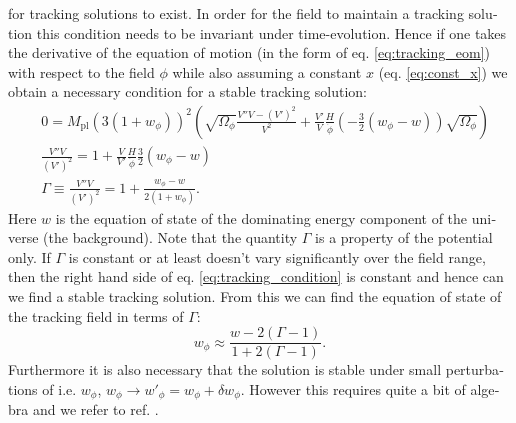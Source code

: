 \documentclass[master,       %
               twoside,        %
               BCOR10mm,       %
               english,ngerman, %
               ]{GAUBM}
\begin{document}
\begin{otherlanguage}{english}
for tracking solutions to exist.
In order for the field to maintain a tracking solution this condition needs to be invariant under time-evolution. Hence if one takes the derivative of the equation of motion (in the form of eq. \eqref{eq:tracking_eom}) with respect to the field $\phi$ while also assuming a constant $x$ (eq. \eqref{eq:const_x}) we obtain a necessary condition for a stable tracking solution:
\begin{align}
	&0 = M_\mathrm{pl}  (3(1 + w_\phi))^2 \left( \sqrt{\Omega_\phi} \frac{V'' V - (V')^2}{V^2} + \frac{V'}{V} \frac{H}{\dot{\phi}} \left( - \frac{3}{2} (w_\phi - w) \right) \sqrt{\Omega_\phi} \right) \nonumber \\
	&\frac{V'' V}{(V')^2} = 1 + \frac{V}{V'} \frac{H}{\dot{\phi}} \frac{3}{2} (w_\phi - w) \nonumber \\
	& \Gamma \equiv \frac{V'' V}{(V')^2} = 1 + \frac{w_\phi - w}{2(1 + w_\phi)}.
	\label{eq:tracking_condition}
\end{align}
Here $w$ is the equation of state of the dominating energy component of the universe (the background).
Note that the quantity $\Gamma$ is a property of the potential only.
If $\Gamma$ is constant or at least doesn't vary significantly over the field range, then the right hand side of eq. \eqref{eq:tracking_condition}  is constant and hence can we find a stable tracking solution.
From this we can find the equation of state of the tracking field in terms of $\Gamma$:
\begin{equation}
	\label{eq:tracking_equation_of_state}
	w_\phi \approx \frac{w - 2(\Gamma - 1)}{1 + 2(\Gamma - 1)}.
\end{equation}
Furthermore it is also necessary that the solution is stable under small perturbations of i.e. $w_\phi$, $w_\phi \to w'_\phi = w_\phi + \delta w_\phi$. However this requires quite a bit of algebra and we refer to ref. \cite{tracking_solutions_Steinhardt:1999nw}.


\end{otherlanguage}
\end{document}
